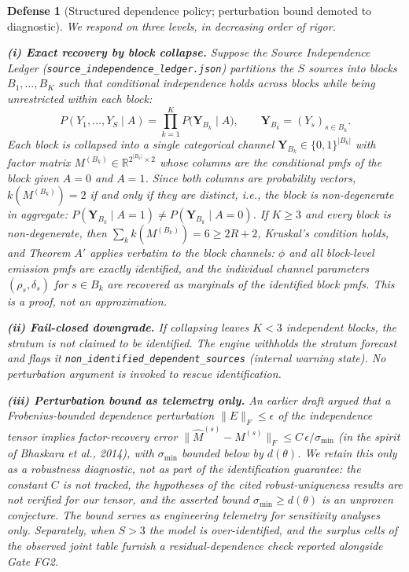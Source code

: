 \documentclass[11pt,a4paper]{article}
\newtheorem{defense}{Defense}
\begin{document}
\begin{defense}[Structured dependence policy; perturbation bound demoted to diagnostic]
We respond on three levels, in decreasing order of rigor. %

\begin{sloppypar}
\textbf{(i) Exact recovery by block collapse.} Suppose the Source Independence Ledger (\texttt{source\_independence\_}\allowbreak\texttt{ledger.json}) partitions the $S$ sources into blocks $B_1, \dots, B_K$ such that conditional independence holds \emph{across} blocks while being unrestricted \emph{within} each block:
\[
P(Y_1, \dots, Y_S \mid A) = \prod_{k=1}^{K} P\big(\mathbf{Y}_{B_k} \mid A\big), \qquad \mathbf{Y}_{B_k} = (Y_s)_{s \in B_k}. %
\]
Each block is collapsed into a single categorical channel $\mathbf{Y}_{B_k} \in \{0, 1\}^{|B_k|}$ with factor matrix $M^{(B_k)} \in \mathbb{R}^{2^{|B_k|} \times 2}$ whose columns are the conditional pmfs of the block given $A = 0$ and $A = 1$. Since both columns are probability vectors, $k(M^{(B_k)}) = 2$ if and only if they are distinct, i.e., the block is non-degenerate in aggregate: $P(\mathbf{Y}_{B_k} \mid A = 1) \neq P(\mathbf{Y}_{B_k} \mid A = 0)$. If $K \ge 3$ and every block is non-degenerate, then $\sum_{k} k(M^{(B_k)}) = 6 \ge 2R + 2$, Kruskal's condition holds, and Theorem $A'$ applies verbatim to the block channels: $\phi$ and all block-level emission pmfs are exactly identified, and the individual channel parameters $(\rho_s, \delta_s)$ for $s \in B_k$ are recovered as marginals of the identified block pmfs. This is a proof, not an approximation. %
\end{sloppypar}

\textbf{(ii) Fail-closed downgrade.} If collapsing leaves $K < 3$ independent blocks, the stratum is \emph{not} claimed to be identified. The engine withholds the stratum forecast and flags it \texttt{non\_identified\_dependent\_sources} (internal warning state). No perturbation argument is invoked to rescue identification. %

\textbf{(iii) Perturbation bound as telemetry only.} An earlier draft argued that a Frobenius-bounded dependence perturbation $\|E\|_F \le \epsilon$ of the independence tensor implies factor-recovery error $\|\hat{M}^{(s)} - M^{(s)}\|_F \le C\,\epsilon / \sigma_{\min}$ (in the spirit of Bhaskara et al., 2014), with $\sigma_{\min}$ bounded below by $d(\theta)$. We retain this only as a \emph{robustness diagnostic}, not as part of the identification guarantee: the constant $C$ is not tracked, the hypotheses of the cited robust-uniqueness results are not verified for our tensor, and the asserted bound $\sigma_{\min} \ge d(\theta)$ is an unproven conjecture. The bound serves as engineering telemetry for sensitivity analyses only. Separately, when $S > 3$ the model is over-identified, and the surplus cells of the observed joint table furnish a residual-dependence check reported alongside Gate FG2. %
\end{defense}
\end{document}

